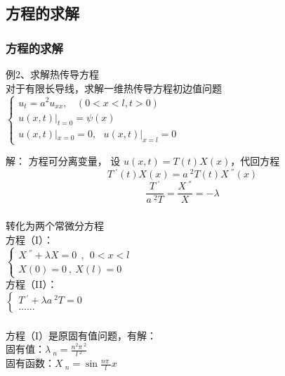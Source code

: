\subsection{方程的求解}
\begin{frame}
	\frametitle{方程的求解}	
	\begin{exampleblock} {例2、求解热传导方程}
	~\\
	对于有限长导线，求解一维热传导方程初边值问题 \\
	$\displaystyle \begin{cases}
		u_{t}=a^2u_{xx} ,~~~~ (0<x<l, t>0)\\
		u(x,t)|_{t=0}= \psi (x)  \\
		u(x,t)|_{x=0}= 0, ~~~  u(x,t)|_{x=l}= 0 
	\end{cases}$ \\
	\end{exampleblock}
	\alert{解：} 方程可分离变量，
	设 $\displaystyle  u(x,t)=T(t)X(x) $，代回方程 \\
	\begin{equation*}
		T~^{'}(t)X(x) =a~^2 T(t)X~^{''}(x) 
	\end{equation*}
	\begin{equation*}
		\frac{T~^{'}}{a~^2 T}=\frac{X~^{''} }{X} =-\lambda 
	\end{equation*}
\end{frame}	

\begin{frame}
	\frametitle{}	
	转化为两个常微分方程 \\
	方程（I）：\\
	$\displaystyle  \begin{cases}
		X~^{''} +\lambda X=0  ~~,~~ 0<x<l\\
		X(0)=0 ~,~X(l)=0
	\end{cases}$ \\	
	方程（II）：\\
	$\displaystyle  \begin{cases}
		T~^{'} +\lambda {a~^2 T}=0 \\
		......
	\end{cases}$ \\	
\end{frame}	

\begin{frame}
	\frametitle{}		
	方程（I）是原固有值问题，有解：\\
	固有值：$\displaystyle  \lambda~_n=\frac{n^2\pi~^2}{l~^2}$ \\ 
	固有函数：{$\displaystyle  X~_n= \sin \frac{n\pi~}{l} x$}\\
\end{frame}	


